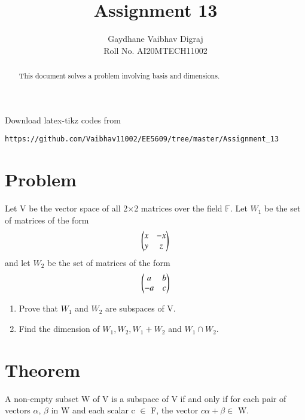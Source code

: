 \documentclass[journal,12pt,twocolumn]{IEEEtran}
\begin{document}
     \def\rightbox#1{\makebox[0in][r]{#1}}
     \def\centbox#1{\makebox[0in]{#1}}
     \def\topbox#1{\raisebox{-\baselineskip}[0in][0in]{#1}}
     \def\midbox#1{\raisebox{-0.5\baselineskip}[0in][0in]{#1}}
\vspace{3cm}
\title{Assignment 13}
\author{Gaydhane Vaibhav Digraj \\ Roll No. AI20MTECH11002}
\maketitle
\newpage
\bigskip
\renewcommand{\thefigure}{\theenumi}
\renewcommand{\thetable}{\theenumi}
\begin{abstract}
This document solves a problem involving basis and dimensions.
\end{abstract}
%
Download latex-tikz codes from 
%
\begin{lstlisting}
https://github.com/Vaibhav11002/EE5609/tree/master/Assignment_13
\end{lstlisting}
%
\section{Problem}
Let V be the vector space of all 2$\times$2 matrices over the field $\mathbb{F}$. Let $W_1$ be the set of matrices of the form 
\begin{align}
    \begin{pmatrix}x&-x\\y&z\end{pmatrix}
\end{align}
and let $W_2$ be the set of matrices of the form 
\begin{align}
    \begin{pmatrix}a&b\\-a&c\end{pmatrix}
\end{align}
\begin{enumerate}
    \item Prove that $W_1$ and $W_2$ are subspaces of V.
    \item Find the dimension of $W_1, W_2, W_1+W_2$ and $W_1\cap W_2$.
\end{enumerate}

\section{Theorem}
A non-empty subset W of V is a subspace of V if and only if for each pair of vectors $\alpha$, $\beta$ in W and each scalar c $\in$ F, the vector $c\alpha+\beta \in$ W.
\end{document}
